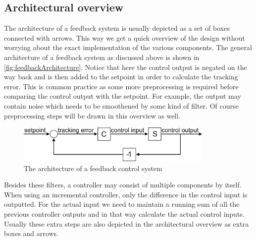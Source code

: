 \subsection{Architectural overview}
The architecture of a feedback system is usually depicted as a set of boxes connected with arrows. This way we get a quick overview of the design without worrying about the exact implementation of the various components. The general architecture of a feedback system as discussed above is shown in \autoref{fig:feedbackArchitecture}. Notice that here the control output is negated on the way back and is then added to the setpoint in order to calculate the tracking error. This is common practice as some more preprocessing is required before comparing the control output with the setpoint. For example, the output may contain noise which needs to be smoothened by some kind of filter. Of course preprocessing steps will be drawn in this overview as well.

\begin{figure}[H]
	\begin{center}
		\includegraphics[width=0.85\textwidth]{figures/FeedbackBig.png}
	\end{center}
	\caption{The architecture of a feedback control system}
	\label{fig:feedbackArchitecture}
\end{figure}

Besides these filters, a controller may consist of multiple components by itself. When using an incremental controller, only the difference in the control input is outputted. For the actual input we need to maintain a running sum of all the previous controller outputs and in that way calculate the actual control inputs. Usually these extra steps are also depicted in the architectural overview as extra boxes and arrows.
